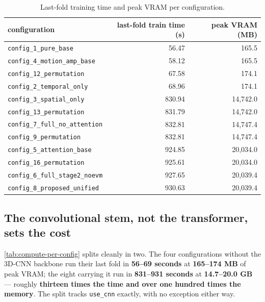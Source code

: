 \begin{table}[htbp]
	\centering
	\begin{tabular}{l r r}
		\hline
		\textbf{configuration} & \textbf{last-fold train time (s)} & \textbf{peak VRAM (MB)} \\
		\hline
		\texttt{config\_1\_pure\_base}          & 56.47  & 165.5 \\
		\texttt{config\_4\_motion\_amp\_base}   & 58.12  & 165.5 \\
		\texttt{config\_12\_permutation}        & 67.58  & 174.1 \\
		\texttt{config\_2\_temporal\_only}      & 68.96  & 174.1 \\
		\texttt{config\_3\_spatial\_only}       & 830.94 & 14,742.0 \\
		\texttt{config\_13\_permutation}        & 831.79 & 14,742.0 \\
		\texttt{config\_7\_full\_no\_attention} & 832.81 & 14,747.4 \\
		\texttt{config\_9\_permutation}         & 832.81 & 14,747.4 \\
		\texttt{config\_5\_attention\_base}     & 924.85 & 20,034.0 \\
		\texttt{config\_16\_permutation}        & 925.61 & 20,034.0 \\
		\texttt{config\_6\_full\_stage2\_noevm} & 927.65 & 20,039.4 \\
		\texttt{config\_8\_proposed\_unified}   & 930.63 & 20,039.4 \\
		\hline
	\end{tabular}
	\caption[Last-fold training time and peak VRAM per configuration]{Last-fold training time and peak VRAM per configuration.}
	\label{tab:compute-per-config}
\end{table}

\subsection{The convolutional stem, not the transformer, sets the cost}
\label{sec:stem-sets-cost}

\autoref{tab:compute-per-config} splits cleanly in two. The four configurations without the 3D-CNN backbone run their last fold in \textbf{56--69 seconds} at \textbf{165--174 MB} of peak VRAM; the eight carrying it run in \textbf{831--931 seconds} at \textbf{14.7--20.0 GB} --- roughly \textbf{thirteen times the time and over one hundred times the memory}. The split tracks \texttt{use\_cnn} exactly, with no exception either way.

